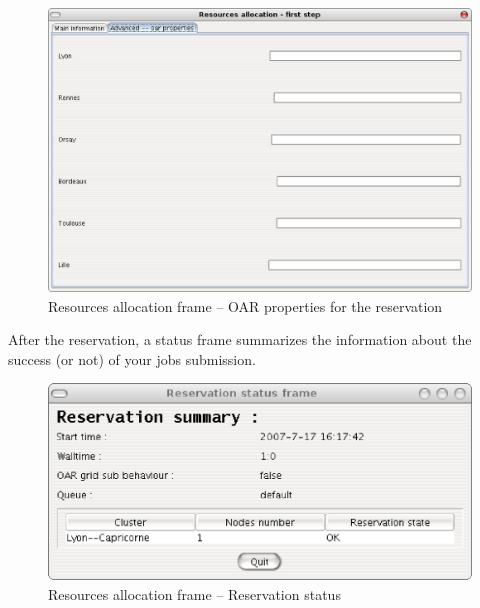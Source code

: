 \begin{figure}[H]
\centering
\includegraphics[width=0.6\linewidth]{figures/GRUDU_allocation_2.eps}
\caption{Resources allocation frame -- OAR properties for the reservation}
\label{fig:cfg_allocation2}
\end{figure}

After the reservation, a status frame summarizes the information about the
success (or not) of your jobs submission.

\begin{figure}[H]
\centering
\includegraphics[width=0.6\linewidth]{figures/GRUDU_reservation1.eps}
\caption{Resources allocation frame -- Reservation status}
\label{fig:reservation_status}
\end{figure}

